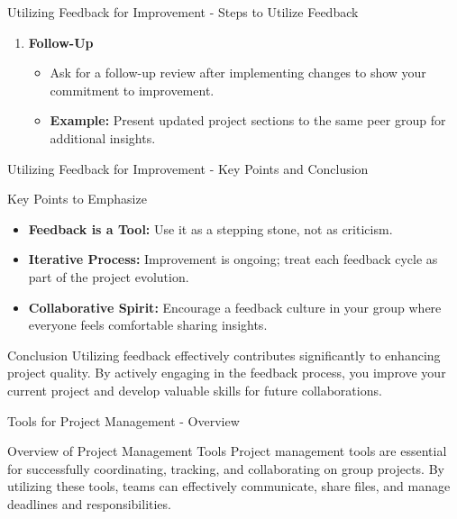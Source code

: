 \documentclass[aspectratio=169]{beamer}
\begin{document}
\begin{frame}[fragile]{Utilizing Feedback for Improvement - Steps to Utilize Feedback}
\begin{enumerate}
        \item \textbf{Follow-Up}
            \begin{itemize}
                \item Ask for a follow-up review after implementing changes to show your commitment to improvement.
                \item \textbf{Example:} Present updated project sections to the same peer group for additional insights.
            \end{itemize}
    \end{enumerate}
\end{frame}

\begin{frame}[fragile]{Utilizing Feedback for Improvement - Key Points and Conclusion}
    \begin{block}{Key Points to Emphasize}
        \begin{itemize}
            \item \textbf{Feedback is a Tool:} Use it as a stepping stone, not as criticism. 
            \item \textbf{Iterative Process:} Improvement is ongoing; treat each feedback cycle as part of the project evolution.
            \item \textbf{Collaborative Spirit:} Encourage a feedback culture in your group where everyone feels comfortable sharing insights.
        \end{itemize}
    \end{block}

    \begin{block}{Conclusion}
        Utilizing feedback effectively contributes significantly to enhancing project quality. By actively engaging in the feedback process, you improve your current project and develop valuable skills for future collaborations.
    \end{block}
\end{frame}

\begin{frame}[fragile]{Tools for Project Management - Overview}
    \begin{block}{Overview of Project Management Tools}
        Project management tools are essential for successfully coordinating, tracking, and collaborating on group projects. By utilizing these tools, teams can effectively communicate, share files, and manage deadlines and responsibilities.
    \end{block}
\end{frame}
\end{document}
